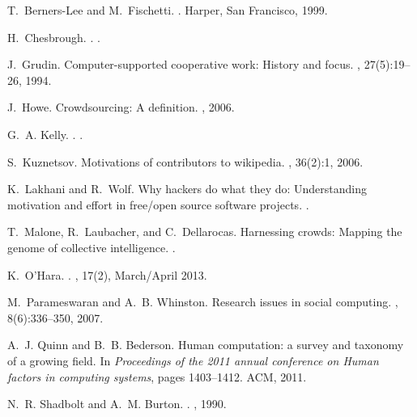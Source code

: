 \documentclass{www13-companion-accepted}
\begin{document}
\begin{thebibliography}{10}

T.~Berners-Lee and M.~Fischetti.
.
\newblock Harper, San Francisco, 1999.

H.~Chesbrough.
.
.

J.~Grudin.
\newblock Computer-supported cooperative work: History and focus.
, 27(5):19--26, 1994.

J.~Howe.
\newblock Crowdsourcing: A definition.
, 2006.

G.~A. Kelly.
.
.

S.~Kuznetsov.
\newblock Motivations of contributors to wikipedia.
, 36(2):1, 2006.

K.~Lakhani and R.~Wolf.
\newblock Why hackers do what they do: Understanding motivation and effort in
  free/open source software projects.
.

T.~Malone, R.~Laubacher, and C.~Dellarocas.
\newblock Harnessing crowds: Mapping the genome of collective intelligence.
.

K.~O'Hara.
.
, 17(2), March/April 2013.

M.~Parameswaran and A.~B. Whinston.
\newblock Research issues in social computing.
,
  8(6):336--350, 2007.

A.~J. Quinn and B.~B. Bederson.
\newblock Human computation: a survey and taxonomy of a growing field.
\newblock In {\em Proceedings of the 2011 annual conference on Human factors in
  computing systems}, pages 1403--1412. ACM, 2011.

N.~R. Shadbolt and A.~M. Burton.
.
,
  1990.


\end{thebibliography}
\end{document}
